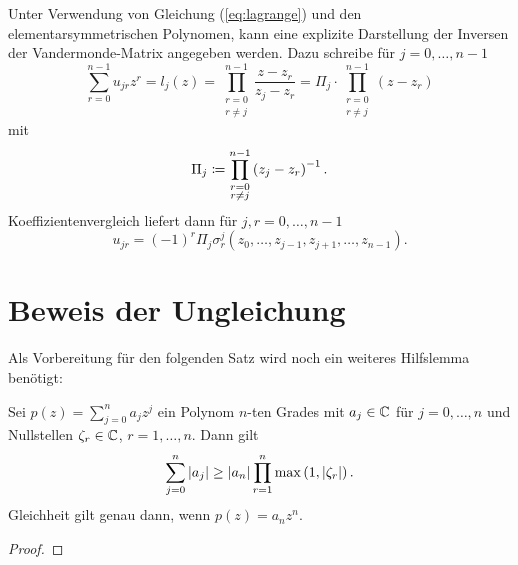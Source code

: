 \begin{remark}
    Unter Verwendung von Gleichung (\ref{eq:lagrange}) und den
    elementarsymmetrischen Polynomen, kann eine explizite Darstellung der
    Inversen der Vandermonde-Matrix angegeben werden.
    Dazu schreibe für $j = 0, \dots, n-1$
    \begin{equation*}
        \sum_{r = 0}^{n-1} u_{jr} z^{r}
        = l_j(z)
        = \prod_{\substack{r=0\\ r \neq j}}^{n-1} \frac{z - z_r}{z_j - z_r}
        = \Pi_j \cdot \prod_{\substack{r=0\\ r \neq j}}^{n-1} \left( z - z_r \right)
    \end{equation*}
    mit
    \begin{equation}
        \label{def:pi_j}
        \Pi_j \coloneqq \prod_{\substack{r=0\\ r \neq j}}^{n-1} \left( z_j - z_r \right)^{-1}.
    \end{equation}
    Koeffizientenvergleich liefert dann für $j, r = 0, \dots, n-1$
    \begin{equation}
        \label{eq:explicit_inverse_vandermonde}
        u_{jr} = (-1)^{r} \Pi_j \sigma_{r}^{j}(z_0, \dots, z_{j-1}, z_{j+1}, \dots, z_{n-1}).
    \end{equation}
\end{remark}

\section{Beweis der Ungleichung}

Als Vorbereitung für den folgenden Satz wird noch ein weiteres Hilfslemma benötigt:

\begin{lemma}
    \label{lemma:polynom_coefficient_sum_inequality}
    Sei $p(z) = \sum_{j = 0}^{n} a_j z^j$ ein Polynom $n$-ten Grades mit
    $a_j \in \mathbb{C}$ für $j = 0, \dots, n$ und Nullstellen
    $\zeta_r \in \mathbb{C}$, $r = 1, \dots, n$.
    Dann gilt
    \begin{equation}
        \label{eq:polynom_coefficient_sum_inequality}
        \sum_{j=0}^{n} \left\lvert a_j \right\rvert \geq \left\lvert a_n \right\rvert \prod_{r=1}^{n} \max \left(1, \left\lvert \zeta_r \right\rvert \right).
    \end{equation}
    Gleichheit gilt genau dann, wenn $p(z) = a_n z^n$.
\end{lemma}

\begin{proof}
\end{proof}

